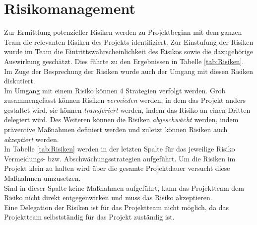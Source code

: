 \chapter{Risikomanagement}
Zur Ermittlung potenzieller Risiken werden zu Projektbeginn mit dem ganzen Team die relevanten Risiken des Projekts identifiziert. Zur Einstufung der Risiken wurde im Team die Eintrittswahrscheinlichkeit des Risikos sowie die dazugehörige Auswirkung geschätzt. Dies führte zu den Ergebnissen in Tabelle \ref{tab:Risiken}. Im Zuge der Besprechung der Risiken wurde auch der Umgang mit diesen Risiken diskutiert. \\
Im Umgang mit einem Risiko können 4 Strategien verfolgt werden. Grob zusammengefasst können Risiken \textit{vermieden} werden, in dem das Projekt anders gestaltet wird, sie können \textit{transferiert} werden, indem das Risiko an einen Dritten delegiert wird. Des Weiteren können die Risiken \textit{abgeschwächt} werden, indem präventive Maßnahmen definiert werden und zuletzt können Risiken auch \textit{akzeptiert} werden. \\
In Tabelle \ref{tab:Risiken} werden in der letzten Spalte für das jeweilige Risiko Vermeidungs- bzw. Abschwächungsstrategien aufgeführt. Um die Risiken im Projekt klein zu halten wird über die gesamte Projektdauer versucht diese Maßnahmen umzusetzen. \\ 
Sind in dieser Spalte keine Maßnahmen aufgeführt, kann das Projektteam dem Risiko nicht direkt entgegenwirken und muss das Risiko akzeptieren. \\
Eine Delegation der Risiken ist für das Projektteam nicht möglich, da das Projektteam selbstständig für das Projekt zuständig ist.

